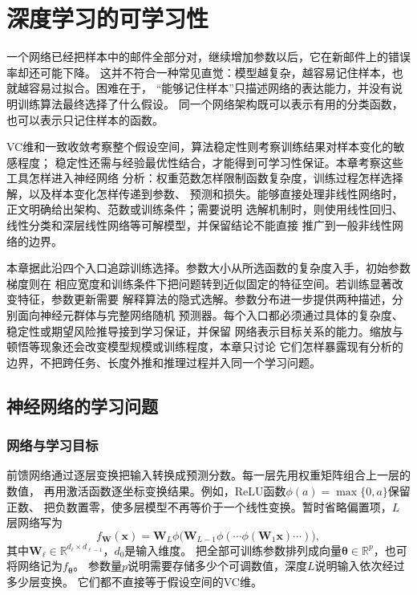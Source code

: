 \chapter{深度学习的可学习性}
\label{chap:deep-learning-theory}

一个网络已经把样本中的邮件全部分对，继续增加参数以后，它在新邮件上的错误率却还可能下降。
这并不符合一种常见直觉：模型越复杂，越容易记住样本，也就越容易过拟合。困难在于，
“能够记住样本”只描述网络的表达能力，并没有说明训练算法最终选择了什么假设。
同一个网络架构既可以表示有用的分类函数，也可以表示只记住样本的函数。

VC维和一致收敛考察整个假设空间，算法稳定性则考察训练结果对样本变化的敏感程度；
稳定性还需与经验最优性结合，才能得到可学习性保证。本章考察这些工具怎样进入神经网络
分析：权重范数怎样限制函数复杂度，训练过程怎样选择解，以及样本变化怎样传递到参数、
预测和损失。能够直接处理非线性网络时，正文明确给出架构、范数或训练条件；需要说明
选解机制时，则使用线性回归、线性分类和深层线性网络等可解模型，并保留结论不能直接
推广到一般非线性网络的边界。

本章据此沿四个入口追踪训练选择。参数大小从所选函数的复杂度入手，初始参数梯度则在
相应宽度和训练条件下把问题转到近似固定的特征空间。若训练显著改变特征，参数更新需要
解释算法的隐式选解。参数分布进一步提供两种描述，分别面向神经元群体与完整网络随机
预测器。每个入口都必须通过具体的复杂度、稳定性或期望风险推导接到学习保证，并保留
网络表示目标关系的能力。缩放与顿悟等现象还会改变模型规模或训练程度，本章只讨论
它们怎样暴露现有分析的边界，不把跨任务、长度外推和推理过程并入同一个学习问题。

\section{神经网络的学习问题}
\label{sec:network-learning-problem}

\subsection{网络与学习目标}

前馈网络通过逐层变换把输入转换成预测分数。每一层先用权重矩阵组合上一层的数值，
再用激活函数逐坐标变换结果。例如，ReLU函数$\phi(a)=\max\{0,a\}$保留正数、
把负数置零，使多层模型不再等价于一个线性变换。暂时省略偏置项，$L$层网络写为
\begin{equation}
 f_{\bm W}(\bm x)=\bm W_L\phi\bigl(\bm W_{L-1}\phi(\cdots\phi(\bm W_1\bm x)\cdots)\bigr),
 \label{eq:feedforward-network}
\end{equation}
其中$\bm W_\ell\in\mathbb R^{d_\ell\times d_{\ell-1}}$，$d_0$是输入维度。
把全部可训练参数排列成向量$\bm\theta\in\mathbb R^p$，也可将网络记为$f_{\bm\theta}$。
参数量$p$说明需要存储多少个可调数值，深度$L$说明输入依次经过多少层变换。
它们都不直接等于假设空间的VC维。


